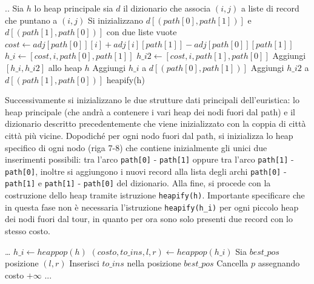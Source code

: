 \documentclass[a4paper,12pt]{report}
\begin{document}
\begin{tcolorbox}[colframe=black, colback=white, boxrule=0.5pt, title=Cheapest Insertion Versione 3, coltitle=black, fonttitle=\bfseries, colbacktitle=white, breakable]
  \begin{algorithmic}[1]
    \State ..
    \State Sia $h$ lo heap principale
    \State sia $d$ il dizionario che associa $(i, j)$ a liste di record che puntano a $(i, j)$
    \State Si inizializzano $d[(path[0], path[1])]$ e $d[(path[1], path[0])]$ con due liste vuote
      \State $cost \gets adj[path[0]][i] + adj[i][path[1]] - adj[path[0]][path[1]]$
      \State $h\_i \gets [cost, i, path[0], path[1]]$
      \State $h\_i2 \gets [cost, i, path[1], path[0]]$
      \State Aggiungi $[h\_i, h\_i2]$ allo heap $h$
      \State Aggiungi $h\_i$ a $d[(path[0], path[1])]$
      \State Aggiungi $h\_i2$ a $d[(path[1], path[0])]$
    \EndFor
    \State heapify(h)
  \end{algorithmic}
\end{tcolorbox}
Successivamente si inizializzano le due strutture dati principali dell'euristica: lo heap principale (che andrà a contenere i vari heap dei nodi fuori dal path) e il dizionario descritto precedentemente che viene inizializzato con la coppia di città città più vicine. Dopodiché per ogni nodo fuori dal path, si inizializza lo heap specifico di ogni nodo (riga 7-8) che contiene inizialmente gli unici due inserimenti possibili: tra l'arco \lstinline!path[0]! - \lstinline!path[1]! oppure tra l'arco \lstinline!path[1]! - \lstinline!path[0]!, inoltre si aggiungono i nuovi record alla lista degli archi \lstinline!path[0]! - \lstinline!path[1]! e \lstinline!path[1]! - \lstinline!path[0]! del dizionario. Alla fine, si procede con la costruzione dello heap tramite istruzione \lstinline!heapify(h)!. Importante specificare che in questa fase non è necessaria l'istruzione \lstinline!heapify(h_i)! per ogni piccolo heap dei nodi fuori dal tour, in quanto per ora sono solo presenti due record con lo stesso costo.
\begin{tcolorbox}[colframe=black, colback=white, boxrule=0.5pt, title=Cheapest Insertion Versione 3, coltitle=black, fonttitle=\bfseries, colbacktitle=white, breakable]
  \begin{algorithmic}[1]
    \State \dots
      \State $h\_i \gets heappop(h)$
      \State $(costo, to\_ins, l, r) \gets heappop(h\_i)$
      \State Sia $best\_pos$ posizione $(l, r)$
      \State Inserisci $to\_ins$ nella posizione $best\_pos$
        \State Cancella $p$ assegnando costo $+\infty$
      \EndFor
      \State ...
    \EndWhile
  \end{algorithmic}
\end{tcolorbox}
\end{document}
